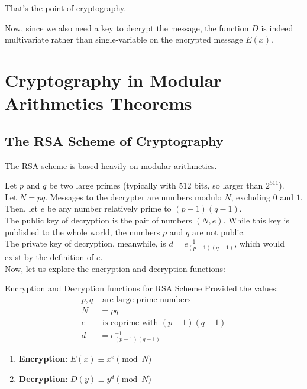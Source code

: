 That's the point of cryptography.

Now, since we also need a key to decrypt the message, the function $D$ is indeed multivariate rather than single-variable on the encrypted message $E(x)$.

\section{Cryptography in Modular Arithmetics Theorems}

\subsection{The RSA Scheme of Cryptography}
The RSA scheme is based heavily on modular arithmetics.

Let $p$ and $q$ be two large primes (typically with 512 bits, so larger than $2^{511}$). \\
Let $N = pq$. Messages to the decrypter are numbers modulo $N$, excluding $0$ and $1$. \\
Then, let $e$ be any number relatively prime to $(p - 1)(q - 1)$. \\
The public key of decryption is the pair of numbers $(N, e)$. While this key is published to the whole world, the numbers $p$ and $q$ are not public. \\
The private key of decryption, meanwhile, is $d = {e}_{(p - 1)(q - 1)}^{-1}$, which would exist by the definition of $e$. \\
Now, let us explore the encryption and decryption functions:
\begin{ln-define}{Encryption and Decryption functions for RSA Scheme}{}
    Provided the values:
    \begin{align*}
        p, q &\text{ are large prime numbers} \\
        N &= pq \\
        e &\text{ is coprime with $(p - 1)(q - 1)$} \\
        d &= {e}_{(p - 1)(q - 1)}^{-1}
    \end{align*}
    \begin{enumerate}
        \item[] \textbf{Encryption}: $E(x) \equiv x^e\pmod{N}$
        \item[] \textbf{Decryption}: $D(y) \equiv y^d\pmod{N}$
    \end{enumerate}
\end{ln-define}
